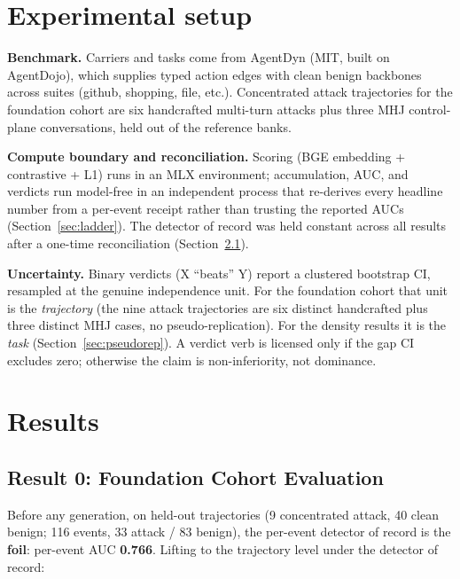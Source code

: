 \documentclass[11pt]{article}
\begin{document}
\section{Experimental setup}

\textbf{Benchmark.} Carriers and tasks come from AgentDyn \citep{agentdyn2026} (MIT, built on AgentDojo),
which supplies typed action edges with clean benign backbones across suites (github, shopping, file,
etc.). Concentrated attack trajectories for the foundation cohort are six handcrafted multi-turn
attacks plus three MHJ control-plane conversations, held out of the
reference banks.

\textbf{Compute boundary and reconciliation.} Scoring (BGE embedding + contrastive + L1) runs in an MLX
environment; accumulation, AUC, and verdicts run model-free in an independent process that
re-derives every headline number from a per-event receipt rather than trusting the reported
AUCs (Section~\ref{sec:ladder}). The detector of record was held constant across all results after a one-time
reconciliation (Section~\ref{sec:result0}).

\textbf{Uncertainty.} Binary verdicts (X ``beats'' Y) report a clustered bootstrap CI, resampled at the
genuine independence unit. For the foundation cohort that unit is the \emph{trajectory} (the nine attack
trajectories are six distinct handcrafted plus three distinct MHJ cases, no pseudo-replication). For
the density results it is the \emph{task} (Section~\ref{sec:pseudorep}). A verdict verb is licensed only if the gap CI
excludes zero; otherwise the claim is non-inferiority, not dominance.

\section{Results}

\subsection{Result 0: Foundation Cohort Evaluation}\label{sec:result0}

Before any generation, on held-out trajectories (9 concentrated attack, 40 clean benign; 116 events,
33 attack / 83 benign), the per-event detector of record is the \textbf{foil}: per-event AUC \textbf{0.766}.
Lifting to the trajectory level under the detector of record:
\end{document}
